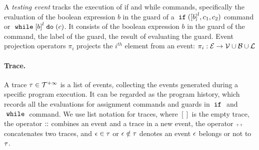  A \emph{testing event} tracks the execution of if and while commands, specifically the evaluation of the boolean expression $b$ in the guard of a $\eif(\clabel{b}^l, c_1, c_2)$ command or $\ewhile \clabel{b}^l \edo (c)$.
 It consists of the boolean expression $b$ in the guard of the command, the label of the guard, the result of evaluating the guard.
%
Event projection operators $\pi_i$ projects the $i^{th}$ element from an event: 
$\pi_i : \mathcal{E} \to \mathcal{V} \cup \mathcal{B} \cup \mathcal{L} $

\paragraph{Trace.}
%
A trace $\mathtt{\tau} \in \mathcal{T}^{+\infty}$ is a list of events, 
collecting the events generated during a specific program execution. 
It can be regarded as the program history, 
which records all the evaluations for assignment commands and guards in $\;\mathtt{if}\;$ and $\;\mathtt{while}\;$ command.
We use list notation for traces, where $[]$ is the empty trace, the operator $\traceadd$ combines an event and a trace in a new event, 
the operator ${\scriptscriptstyle ++}$ concatenates two traces, and $\mathtt{\epsilon} \in \mathtt{\tau}$ or $\mathtt{\epsilon} \notin \mathtt{\tau}$ denotes an event $\mathtt{\epsilon}$ belongs or not to $\mathtt{\tau}$.
